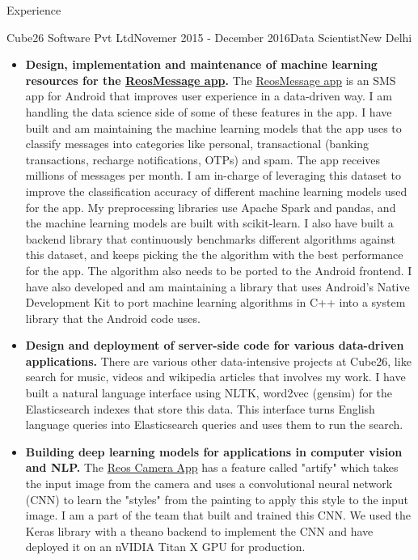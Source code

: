 \documentclass{resume} %
\begin{document}
\begin{rSection}{Experience}
\begin{rSubsection}{Cube26 Software Pvt Ltd}{Novemer 2015 - December 2016}{Data
    Scientist}{New Delhi}
\begin{itemize}
\item \textbf{Design, implementation and maintenance of machine learning resources for the \href{http://bit.ly/2bB0uGK}{ReosMessage app}.}
    The \href{http://bit.ly/2bB0uGK}{ReosMessage app} is an SMS app for Android
    that improves user experience in a data-driven way. I am handling the data
    science side of some of these features in the app. I have built and am
    maintaining the machine learning models that the app uses to classify
    messages into categories like personal, transactional (banking transactions,
    recharge notifications, OTPs) and spam. The app receives millions of
    messages per month. I am in-charge of leveraging this dataset to improve
    the classification accuracy of different machine learning models used for
    the app. My preprocessing libraries use Apache Spark and pandas, and the
    machine learning models are built with scikit-learn. I also have built
    a backend library that continuously benchmarks different algorithms against
    this dataset, and keeps picking the the algorithm with the best performance
    for the app. The algorithm also needs to be ported to the Android frontend.
    I have also developed and am maintaining a library that uses Android's
    Native Development Kit to port machine learning algorithms in C++ into a
    system library that the Android code uses.
\item \textbf{Design and deployment of server-side code for various data-driven applications.}
    There are various other data-intensive projects at Cube26, like search for
    music, videos and wikipedia articles that involves my work. I have built a
    natural language interface using NLTK, word2vec (gensim) for the
    Elasticsearch indexes that store this data. This interface turns English
    language queries into Elasticsearch queries and uses them to run the
    search.
\item \textbf{Building deep learning models for applications in computer vision and NLP.}
    The \href{http://bit.ly/2dlIoNg}{Reos Camera App} has a feature called
    "artify" which takes the input image from the camera and uses a
    convolutional neural network (CNN) to learn the "styles" from the painting
    to apply this style to the input image. I am a part of the team that built
    and trained this CNN. We used the Keras library with a theano backend to
    implement the CNN and have deployed it on an nVIDIA Titan X GPU for
    production.
\end{itemize}
\end{rSubsection}


\end{rSection}
\end{document}
